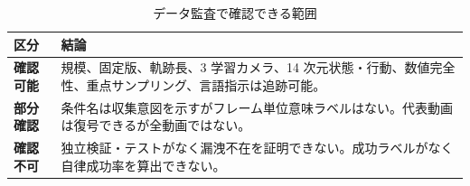 
\begin{table}[H]
\centering
\small
\caption{データ監査で確認できる範囲}
\begin{tabularx}{\textwidth}{>{\japanesesans\bfseries}p{32mm}X}
\toprule
区分 & 結論\\
\midrule
確認可能 & 規模、固定版、軌跡長、3 学習カメラ、14 次元状態・行動、数値完全性、重点サンプリング、言語指示は追跡可能。\\
部分確認 & 条件名は収集意図を示すがフレーム単位意味ラベルはない。代表動画は復号できるが全動画ではない。\\
確認不可 & 独立検証・テストがなく漏洩不在を証明できない。成功ラベルがなく自律成功率を算出できない。\\
\bottomrule
\end{tabularx}
\end{table}
